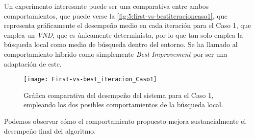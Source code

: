 Un experimento interesante puede ser una comparativa entre ambos comportamientos, que puede verse la \autoref{fig:5:first-vs-bestiteracioncaso1}, que representa gráficamente el desempeño medio en cada iteración para el Caso 1, que emplea un \textit{VND}, que es únicamente determinista, por lo que tan solo emplea la búsqueda local como medio de búsqueda dentro del entorno. Se ha llamado al comportamiento híbrido como simplemente \textit{Best Improvement} por ser una adaptación de este.

\begin{figure}
	\centering
	\texttt{[image: First-vs-best\_iteracion\_Caso1]}
	\caption{Gráfica comparativa del desempeño del sistema para el Caso 1, empleando los dos posibles comportamientos de la búsqueda local.}
	\label{fig:5:first-vs-bestiteracioncaso1}
\end{figure}

Podemos observar cómo el comportamiento propuesto mejora sustancialmente el desempeño final del algoritmo.